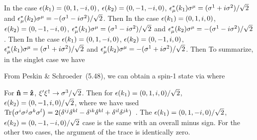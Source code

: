 \documentclass[11pt]{article}
\begin{document}
{	In the case $\epsilon(k_1) = (0, 1, -i, 0)$, $\epsilon(k_2) = (0, -1, -i, 0)$, $\epsilon_\mu^*(k_1) \sigma^\mu = (\sigma^1 + i \sigma^2) / \sqrt{2}$ and $\epsilon_\mu^*(k_2) \sigma^\mu = -(\sigma^1 - i \sigma^2) / \sqrt{2}$.  Then
	In the case $\epsilon(k_1) = (0, 1, i, 0)$, $\epsilon(k_2) = (0, -1, -i, 0)$, $\epsilon_\mu^*(k_1) \sigma^\mu = (\sigma^1 - i \sigma^2) / \sqrt{2}$ and $\epsilon_\mu^*(k_2) \sigma^\mu = -(\sigma^1 - i \sigma^2) / \sqrt{2}$.  Then
	In the case $\epsilon(k_1) = (0, 1, -i, 0)$, $\epsilon(k_2) = (0, -1, i, 0)$, $\epsilon_\mu^*(k_1) \sigma^\mu = (\sigma^1 + i \sigma^2) / \sqrt{2}$ and $\epsilon_\mu^*(k_2) \sigma^\mu = -(\sigma^1 + i \sigma^2) / \sqrt{2}$.  Then
	To summarize, in the singlet case we have
		
	From Peskin \& Schroeder~(5.48), we can obtain a spin-1 state via
	where~\cite[p.~150]{Peskin}
	
	For $\vb{\hat{n}} = \vb{\hat{z}}$, $\xi' \xi^\dag \to \sigma^3 / \sqrt{2}$.  Then for $\epsilon(k_1) = (0, 1, i, 0) / \sqrt{2}$, $\epsilon(k_2) = (0, -1, i, 0) / \sqrt{2}$,
	where we have used $\Tr(\sigma^i \sigma^j \sigma^k \sigma^l) = 2 (\delta^{i j} \delta^{k l} - \delta^{i k} \delta^{k l} + \delta^{i l} \delta^{j k})$~\cite{Pauli}.  The $\epsilon(k_1) = (0, 1, -i, 0) / \sqrt{2}$, $\epsilon(k_2) = (0, -1, -i, 0) / \sqrt{2}$ case is the same with an overall minus sign.  For the other two cases, the argument of the trace is identically zero.
	
}
\end{document}
